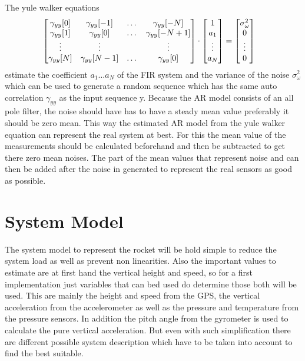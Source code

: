   The yule walker equations
  \begin{align*}
    \begin{bmatrix}
     \gamma_{yy}[0] & \gamma_{yy}[-1] & \dots & \gamma_{yy}[-N] \\
     \gamma_{yy}[1] & \gamma_{yy}[0] & \dots & \gamma_{yy}[-N+1] \\
     \vdots 		& \vdots 	& 	& \vdots	\\
     \gamma_{yy}[N] & \gamma_{yy}[N-1] & \dots & \gamma_{yy}[0]
    \end{bmatrix}
    & \cdot
    \begin{bmatrix}
     1 \\
     a_1 \\
     \vdots \\
     a_N   
    \end{bmatrix}
    = 
    \begin{bmatrix}
     \sigma^2_\omega \\
     0 \\
     \vdots \\
     0
    \end{bmatrix}
    \hfill
  \end{align*}
  \hfill
  estimate the coefficient $a_1 \dots a_N $ of the FIR system and the variance of the noise $\sigma^2_\omega $ which can be used to generate a random sequence which has the same auto correlation $\gamma_{yy}$ as the input sequence y.
  Because the AR model consists of an all pole filter, the noise should have has to have a steady mean value preferably it should be zero mean.
  This way the estimated AR model from the yule walker equation can represent the real system at best.
  For this the mean value of the measurements should be calculated beforehand and then be subtracted to get there zero mean noises.
  The part of the mean values that represent noise and can then be added after the noise in generated to represent the real sensors as good as possible.
  
  \section{System Model}
  The system model to represent the rocket will be hold simple to reduce the system load as well as prevent non linearities.
  Also the important values to estimate are at first hand the vertical height and speed, so
  for a first implementation just variables that can bed used do determine those both will be used.
  This are mainly the height and speed from the GPS, the vertical acceleration from the accelerometer
  as well as the pressure and temperature from the pressure sensors. In addition the pitch angle from the gyrometer is used to calculate the pure vertical acceleration.
  But even with such simplification there are different possible system description which have to be taken into account 
  to find the best suitable.
  
